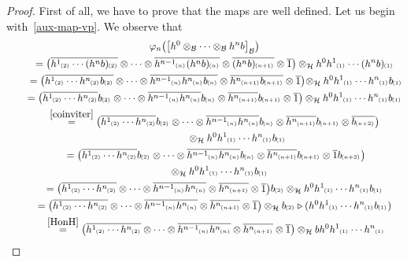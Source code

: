 \documentclass[pdftex]{sigma}
\numberwithin{equation}{section}
\newcommand{\ps}[1]{~\hspace{-4pt}_{^{(#1)}}}
\newcommand{\wbar}[1]{\overline{#1}}
\begin{document}
\begin{proof}
First of all, we have to prove that the maps are well def\/ined.
Let us begin with~\eqref{aux-map-vp}.
We observe that
\begin{gather*}
\varphi_n\big(\big[h^0\otimes_{\cal B}\cdots\otimes_{\cal B} h^nb\big]_{\cal B}\big)
\\
\qquad
=\big(\wbar{h^1\ps{2}\cdots (h^nb)\ps{2}}
\otimes\dots\otimes \wbar{h^{n-1}\ps{n}(h^nb)\ps{n}} \otimes
\wbar{(h^nb)\ps{n+1}} \otimes \wbar{1} \big)
\otimes_{\cal H} h^0h^1\ps{1}\cdots (h^nb)\ps{1}
\\
\qquad{}
=\big(\wbar{h^1\ps{2}\cdots h^n\ps{2}b\ps{2}}
\otimes\dots\otimes \wbar{h^{n-1}\ps{n}h^n\ps{n}b\ps{n}} \otimes
\wbar{h^n\ps{n+1}b\ps{n+1}} \otimes \wbar{1} \big)\!
\otimes_{\cal H} h^0h^1\ps{1}\cdots h^n\ps{1}b\ps{1}
\\
\qquad
=\big(\wbar{h^1\ps{2}\cdots h^n\ps{2}}b\ps{2}
\otimes\dots\otimes \wbar{h^{n-1}\ps{n}h^n\ps{n}}b\ps{n} \otimes
\wbar{h^n\ps{n+1}}b\ps{n+1} \otimes \wbar{1}\big) \otimes_{\cal H} h^0h^1\ps{1}\cdots h^n\ps{1}b\ps{1}
\\
\qquad
\stackrel{\eqref{coinviter}}{=}
\big(\wbar{h^1\ps{2}\cdots h^n\ps{2}}b\ps{2}
\otimes\dots\otimes \wbar{h^{n-1}\ps{n}h^n\ps{n}}b\ps{n} \otimes
\wbar{h^n\ps{n+1}}b\ps{n+1} \otimes \wbar{b\ps{n+2}}\big)\\
\qquad\hphantom{\stackrel{\eqref{coinviter}}{=}}{}
\otimes_{\cal H} h^0h^1\ps{1}\cdots h^n\ps{1}b\ps{1}
\\
\qquad{}
=\big(\wbar{h^1\ps{2}\cdots h^n\ps{2}}b\ps{2}
\otimes\dots\otimes \wbar{h^{n-1}\ps{n}h^n\ps{n}}b\ps{n} \otimes
\wbar{h^n\ps{n+1}}b\ps{n+1} \otimes \wbar{1}b\ps{n+2}\big)\\
\qquad{}
\hphantom{=}{}
 \otimes_{\cal H} h^0h^1\ps{1}\cdots h^n\ps{1}b\ps{1}
\\
\qquad
=\big(\wbar{h^1\ps{2}\cdots h^n\ps{2}}
\otimes\dots\otimes \wbar{h^{n-1}\ps{n}h^n\ps{n}} \otimes \wbar{h^n\ps{n+1}}
\otimes \wbar{1}\big)b\ps{2} \otimes_{\cal H} h^0h^1\ps{1}\cdots h^n\ps{1}b\ps{1}
\\
\qquad
=\big(\wbar{h^1\ps{2}\cdots h^n\ps{2}}
\otimes\dots\otimes \wbar{h^{n-1}\ps{n}h^n\ps{n}} \otimes \wbar{h^n\ps{n+1}}
\otimes \wbar{1}\big) \otimes_{\cal H} b\ps{2}\triangleright (h^0h^1\ps{1}\cdots h^n\ps{1}b\ps{1})
\\
\qquad{}
\stackrel{\eqref{HonH}}{=}
\big(\wbar{h^1\ps{2}\cdots h^n\ps{2}}
\otimes\dots\otimes \wbar{h^{n-1}\ps{n}h^n\ps{n}} \otimes \wbar{h^n\ps{n+1}}
\otimes \wbar{1}\big) \otimes_{\cal H} bh^0h^1\ps{1}\cdots h^n\ps{1}

\end{gather*}
\end{proof}
\end{document}

